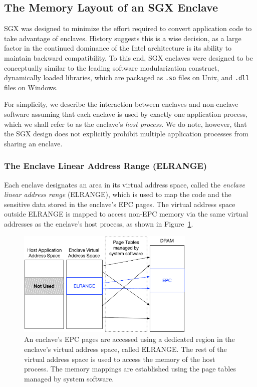 \subsection{The Memory Layout of an SGX Enclave}
\label{sec:sgx_enclave_layout}

SGX was designed to minimize the effort required to convert application code to
take advantage of enclaves. History suggests this is a wise decision, as a
large factor in the continued dominance of the Intel architecture is its
ability to maintain backward compatibility. To this end, SGX enclaves were
designed to be conceptually similar to the leading software modularization
construct, dynamically loaded libraries, which are packaged as \texttt{.so}
files on Unix, and \texttt{.dll} files on Windows.

For simplicity, we describe the interaction between enclaves and non-enclave
software assuming that each enclave is used by exactly one application process,
which we shall refer to as the enclave's \textit{host process}. We do note,
however, that the SGX design does not explicitly prohibit multiple application
processes from sharing an enclave.


\subsubsection{The Enclave Linear Address Range (ELRANGE)}
\label{sec:sgx_elrange}


Each enclave designates an area in its virtual address space, called the
\textit{enclave linear address range} (ELRANGE), which is used to map the code
and the sensitive data stored in the enclave's EPC pages. The virtual address
space outside ELRANGE is mapped to access non-EPC memory via the same virtual
addresses as the enclave's host process, as shown in
Figure~\ref{fig:sgx_elrange}.

\begin{figure}[hbt]
  \centering
  \includegraphics[width=85mm]{figures/sgx_elrange.pdf}
  \caption{
    An enclave's EPC pages are accessed using a dedicated region in the
    enclave's virtual address space, called ELRANGE. The rest of the virtual
    address space is used to access the memory of the host process. The memory
    mappings are established using the page tables managed by system software.
  }
  \label{fig:sgx_elrange}
\end{figure}

